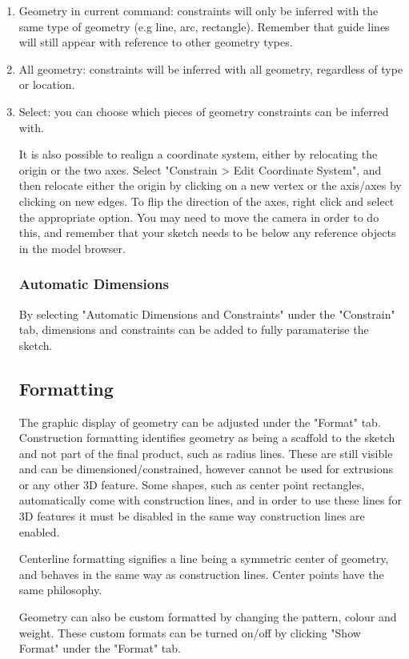 \begin{enumerate}
    \item Geometry in current command: constraints will only be inferred with the same type of geometry (e.g line, arc, rectangle). Remember that guide lines will still appear with reference to other geometry types.
    \item All geometry: constraints will be inferred with all geometry, regardless of type or location.
    \item Select: you can choose which pieces of geometry constraints can be inferred with.

It is also possible to realign a coordinate system, either by relocating the origin or the two axes. Select "Constrain > Edit Coordinate System", and then relocate either the origin by clicking on a new vertex or the axis/axes by clicking on new edges. To flip the direction of the axes, right click and select the appropriate option. You may need to move the camera in order to do this, and remember that your sketch needs to be below any reference objects in the model browser. 


\subsubsection{Automatic Dimensions}
By selecting "Automatic Dimensions and Constraints" under the "Constrain" tab, dimensions and constraints can be added to fully paramaterise the sketch.

\subsection{Formatting}

The graphic display of geometry can be adjusted under the "Format" tab. Construction formatting identifies geometry as being a scaffold to the sketch and not part of the final product, such as radius lines. These are still visible and can be dimensioned/constrained, however cannot be used for extrusions or any other 3D feature. Some shapes, such as center point rectangles, automatically come with construction lines, and in order to use these lines for 3D features it must be disabled in the same way construction lines are enabled.

Centerline formatting signifies a line being a symmetric center of geometry, and behaves in the same way as construction lines. Center points have the same philosophy.

Geometry can also be custom formatted by changing the pattern, colour and weight. These custom formats can be turned on/off by clicking "Show Format" under the "Format" tab.


\end{enumerate}
